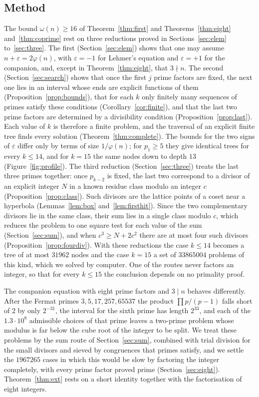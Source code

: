 \documentclass[11pt,reqno]{amsart}
\numberwithin{equation}{section}
\theoremstyle{plain}
\theoremstyle{definition}
\theoremstyle{remark}
\begin{document}
\subsection{Method}
The bound $\omega(n)\ge16$ of Theorem~\ref{thm:first} and
Theorems~\ref{thm:eight} and~\ref{thm:coprime} rest on three
reductions proved in Sections~\ref{sec:elem} to~\ref{sec:three}. The
first (Section~\ref{sec:elem}) shows that one may assume
$n+\varepsilon=2\varphi(n)$, with $\varepsilon=-1$ for Lehmer's
equation and $\varepsilon=+1$ for the companion, and, except in
Theorem~\ref{thm:eight}, that $3\nmid n$. The second
(Section~\ref{sec:search}) shows that once the first $j$ prime factors
are fixed, the next one lies in an interval whose ends are explicit
functions of them (Proposition~\ref{prop:bounds}), that for each $k$
only finitely many sequences of primes satisfy these conditions
(Corollary~\ref{cor:finite}), and that the last two prime factors are
determined by a divisibility condition (Proposition~\ref{prop:last}).
Each value of $k$ is therefore a finite problem, and the traversal of
an explicit finite tree finds every solution
(Theorem~\ref{thm:complete}). The bounds for the two signs of
$\varepsilon$ differ only by terms of size $1/\varphi(n)$; for
$p_1\ge5$ they give identical trees for every $k\le14$, and for $k=15$
the same nodes down to depth $13$ (Figure~\ref{fig:profile}). The
third reduction (Section~\ref{sec:three}) treats the last three primes
together: once $p_{k-2}$ is fixed, the last two correspond to a divisor
of an explicit integer $N$ in a known residue class modulo an integer
$c$ (Proposition~\ref{prop:class}). Such divisors are the lattice
points of a coset near a hyperbola (Lemmas~\ref{lem:box}
and~\ref{lem:firsthit}). Since the two complementary divisors lie in
the same class, their sum lies in a single class modulo $c$, which
reduces the problem to one square test for each value of the sum
(Section~\ref{sec:sum}), and when $c^3\ge N+2c^2$ there are at most
four such divisors (Proposition~\ref{prop:fourdiv}). With these
reductions the case $k\le14$ becomes a tree of at most $31962$ nodes
and the case $k=15$ a set of $33865004$ problems of this kind, which
we solved by computer. One of the routes never factors an integer, so
that for every $k\le15$ the conclusion depends on no primality proof.

The companion equation with eight prime factors and $3\mid n$ behaves
differently. After the Fermat primes $3,5,17,257,65537$ the product
$\prod p/(p-1)$ falls short of $2$ by only $2^{-31}$, the interval for
the sixth prime has length $2^{33}$, and each of the
$1.3\cdot10^8$ admissible choices of that prime leaves a two-prime
problem whose modulus is far below the cube root of the integer to be
split. We treat these problems by the sum route of
Section~\ref{sec:sum}, combined with trial division for the small
divisors and sieved by congruences that primes satisfy, and we settle
the $1967265$ cases in which this would be slow by factoring the integer
completely, with every prime factor proved prime
(Section~\ref{sec:eight}). Theorem~\ref{thm:ext} rests on a short
identity together with the factorisation of eight integers.
\end{document}
